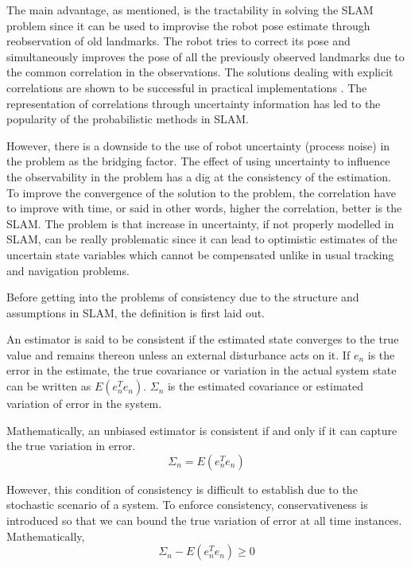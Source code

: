 The main advantage, as mentioned, is the tractability in solving the SLAM problem since it can be used to improvise the robot pose estimate through reobservation of old landmarks. The robot tries to correct its pose and simultaneously improves the pose of all the previously observed landmarks due to the common correlation in the observations. The solutions dealing with explicit correlations are shown to be successful in practical implementations \cite{durrant2006simultaneous}. The representation of correlations through uncertainty information has led to the popularity of the probabilistic methods in SLAM.      

However, there is a downside to the use of robot uncertainty (process noise) in the problem as the bridging factor. The effect of using uncertainty to influence the observability in the problem has a dig at the consistency of the estimation. To improve the convergence of the solution to the problem, the correlation have to improve with time, or said in other words, higher the correlation, better is the SLAM. The problem is that increase in uncertainty, if not properly modelled in SLAM, can be really problematic since it can lead to optimistic estimates of the uncertain state variables which cannot be compensated unlike in usual tracking and navigation problems.  

Before getting into the problems of consistency due to the structure and assumptions in SLAM, the definition \cite{julier2001counter} is first laid out.
\begin{defn}
An estimator is said to be consistent if the estimated state converges to the true value and remains thereon unless an external disturbance acts on it. If $e_n$ is the error in the estimate, the true covariance or variation in the actual system state can be written as $E(e_n^Te_n)$. $\Sigma_n$ is the estimated covariance or estimated variation of error in the system. 

Mathematically, an unbiased estimator is consistent if and only if it can capture the true variation in error. 
\begin{equation}
\Sigma_n=E(e_n^Te_n)
\end{equation} 
\end{defn}

However, this condition of consistency is difficult to establish due to the stochastic scenario of a system. To enforce consistency, conservativeness is introduced so that we can bound the true variation of error at all time instances. Mathematically,
\begin{equation}
\Sigma_n-E(e_n^Te_n)\geq 0
\end{equation} 

